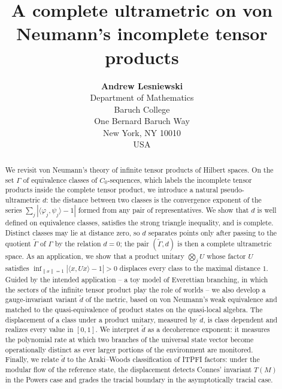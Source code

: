 \documentclass[twoside,11pt,letter]{article}
\theoremstyle{definition}
\theoremstyle{definition}
\theoremstyle{plain}
\begin{document}
\title{\textbf{A complete ultrametric on von Neumann's incomplete tensor products}}
\author{\textbf{Andrew Lesniewski}\\
Department of Mathematics\\
Baruch College\\
One Bernard Baruch Way\\
New York, NY 10010\\
USA}
\maketitle

\begin{abstract}
We revisit von Neumann's theory of infinite tensor products of Hilbert spaces. On the set $\Gamma$ of equivalence classes of $C_0$-sequences, which labels the incomplete tensor products inside the complete tensor product, we introduce a natural pseudo-ultrametric $d$: the distance between two classes is the convergence exponent of the series $\sum_j|\langle\varphi_j,\psi_j\rangle-1|$ formed from any pair of representatives. We show that $d$ is well defined on equivalence classes, satisfies the strong triangle inequality, and is complete. Distinct classes may lie at distance zero, so $d$ separates points only after passing to the quotient $\widetilde\Gamma$ of $\Gamma$ by the relation $d=0$; the pair $(\widetilde\Gamma,d)$ is then a complete ultrametric space. As an application, we show that a product unitary $\bigotimes_j U$ whose factor $U$ satisfies $\inf_{\|x\|=1}|\langle x,Ux\rangle-1|>0$ displaces every class to the maximal distance $1$. Guided by the intended application -- a toy model of Everettian branching, in which the sectors of the infinite tensor product play the role of worlds -- we also develop a gauge-invariant variant $\tilde d$ of the metric, based on von Neumann's weak equivalence and matched to the quasi-equivalence of product states on the quasi-local algebra. The displacement of a class under a product unitary, measured by $\tilde d$, is class dependent and realizes every value in $[0,1]$. We interpret $\tilde d$ as a decoherence exponent: it measures the polynomial rate at which two branches of the universal state vector become operationally distinct as ever larger portions of the environment are monitored. Finally, we relate $\tilde d$ to the Araki--Woods classification of ITPFI factors: under the modular flow of the reference state, the displacement detects Connes' invariant $T(M)$ in the Powers case and grades the tracial boundary in the asymptotically tracial case.
\end{abstract}
\end{document}
